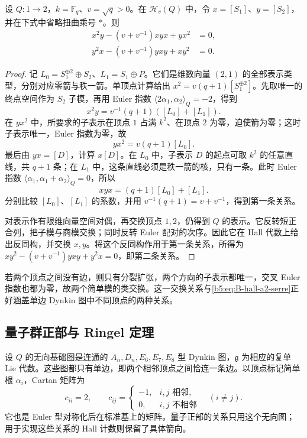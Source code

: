 \begin{proposition}\label{b5:prop:B-hall-a2-serre}
	设 \(Q:1\to2\)，\(k=\mathbb F_q\)、\(v=\sqrt q>0\)。在 \(\mathcal H_v(Q)\) 中，令 \(x=[S_1]\)、\(y=[S_2]\)，并在下式中省略扭曲乘号 \(*\)。则
	\begin{equation}\label{b5:eq:B-hall-a2-serre}
		\begin{aligned}
		x^2y-(v+v^{-1})xyx+yx^2&=0,\\
		y^2x-(v+v^{-1})yxy+xy^2&=0.
		\end{aligned}
	\end{equation}
\end{proposition}
\begin{proof}
	记 \(L_0=S_1^{\oplus2}\oplus S_2\)、\(L_1=S_1\oplus P\)。它们是维数向量 \((2,1)\) 的全部表示类型，分别对应零箭与秩一箭。单顶点计算给出 \(x^2=v(q+1)[S_1^{\oplus2}]\)。先取唯一的终点空间作为 \(S_2\) 子模，再用 Euler 指数 \(\langle2\alpha_1,\alpha_2\rangle_Q=-2\)，得到
	\[
		x^2y=v^{-1}(q+1)([L_0]+[L_1]).
	\]
	在 \(yx^2\) 中，所要求的子表示在顶点 \(1\) 占满 \(k^2\)、在顶点 \(2\) 为零，迫使箭为零；这时子表示唯一，Euler 指数为零，故
	\[
		yx^2=v(q+1)[L_0].
	\]
	最后由 \(yx=[D]\)，计算 \(x[D]\)。在 \(L_0\) 中，子表示 \(D\) 的起点可取 \(k^2\) 的任意直线，共 \(q+1\) 条；在 \(L_1\) 中，这条直线必须是秩一箭的核，只有一条。此时 Euler 指数 \(\langle\alpha_1,\alpha_1+\alpha_2\rangle_Q=0\)，所以
	\[
		xyx=(q+1)[L_0]+[L_1].
	\]
	分别比较 \([L_0]\)、\([L_1]\) 的系数，并用 \(v^{-1}(q+1)=v+v^{-1}\)，得到第一条关系。

	对表示作有限维向量空间对偶，再交换顶点 \(1,2\)，仍得到 \(Q\) 的表示。它反转短正合列，把子模与商模交换；同时反转 Euler 配对的次序。因此它在 Hall 代数上给出反同构，并交换 \(x,y\)。将这个反同构作用于第一条关系，所得为 \(xy^2-(v+v^{-1})yxy+y^2x=0\)，即第二条关系。
\end{proof}
若两个顶点之间没有边，则只有分裂扩张，两个方向的子表示都唯一，交叉 Euler 指数也都为零，故两个简单模的类交换。这一交换关系与\eqref{b5:eq:B-hall-a2-serre}正好涵盖单边 Dynkin 图中不同顶点的两种关系。

\subsection{量子群正部与 Ringel 定理}
\label{b5:subsec:B06:04}

设 \(Q\) 的无向基础图是连通的 \(A_n,D_n,E_6,E_7,E_8\) 型 Dynkin 图，\(\mathfrak g\) 为相应的复单 Lie 代数。这些图都只有单边，即两个相邻顶点之间恰连一条边。以顶点标记简单根 \(\alpha_i\)，Cartan 矩阵为
\[
	c_{ii}=2,\qquad
	c_{ij}=\begin{cases}-1,&i,j\text{ 相邻},\\0,&i,j\text{ 不相邻}\end{cases}
	\quad(i\ne j).
\]
它也是 Euler 型对称化后在标准基上的矩阵。量子正部的关系只用这个无向图；用于实现这些关系的 Hall 计数则保留了具体箭向。

